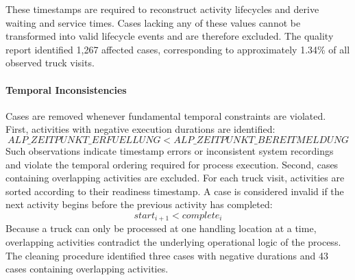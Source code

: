             These timestamps are required to reconstruct activity lifecycles and derive waiting and service times. Cases lacking any of these values cannot be transformed into valid lifecycle events and are therefore excluded. The quality report identified 1,267 affected cases, corresponding to approximately 1.34\% of all observed truck visits. 
            
            \paragraph{Temporal Inconsistencies}
            Cases are removed whenever fundamental temporal constraints are violated. First, activities with negative execution durations are identified:
            \begin{equation} ALP\_ZEITPUNKT\_ERFUELLUNG < ALP\_ZEITPUNKT\_BEREITMELDUNG 
            \end{equation} 
            Such observations indicate timestamp errors or inconsistent system recordings and violate the temporal ordering required for process execution. Second, cases containing overlapping activities are excluded. For each truck visit, activities are sorted according to their readiness timestamp. A case is considered invalid if the next activity begins before the previous activity has completed: 
            \begin{equation} start_{i+1} < complete_i 
            \end{equation} 
            Because a truck can only be processed at one handling location at a time, overlapping activities contradict the underlying operational logic of the process. The cleaning procedure identified three cases with negative durations and 43 cases containing overlapping activities. 
            
